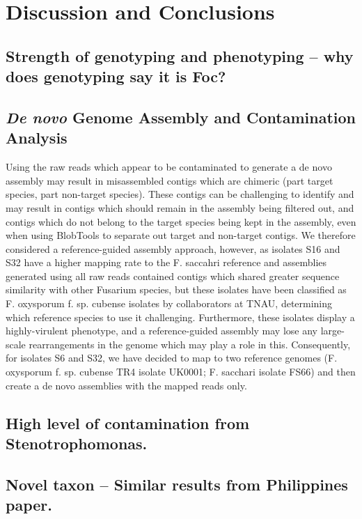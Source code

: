 
\section{Discussion and Conclusions}
\subsection{Strength of genotyping and phenotyping – why does genotyping say it is Foc?}
\subsection{\textit{De novo} Genome Assembly and Contamination Analysis}
Using the raw reads which appear to be contaminated to generate a de novo assembly may result in misassembled contigs which are chimeric (part target species, part non-target species). These contigs can be challenging to identify and may result in contigs which should remain in the assembly being filtered out, and contigs which do not belong to the target species being kept in the assembly, even when using BlobTools to separate out target and non-target contigs. We therefore considered a reference-guided assembly approach, however, as isolates S16 and S32 have a higher mapping rate to the F. saccahri reference and assemblies generated using all raw reads contained contigs which shared greater sequence similarity with other Fusarium species, but these isolates have been classified as F. oxysporum f. sp. cubense isolates by collaborators at TNAU, determining which reference species to use it challenging. Furthermore, these isolates display a highly-virulent phenotype, and a reference-guided assembly may lose any large-scale rearrangements in the genome which may play a role in this. Consequently, for isolates S6 and S32, we have decided to map to two reference genomes (F. oxysporum f. sp. cubense TR4 isolate UK0001; F. sacchari isolate FS66) and then create a de novo assemblies with the mapped reads only. 
\subsection{High level of contamination from Stenotrophomonas.}
\subsection{Novel taxon – Similar results from Philippines paper.}

